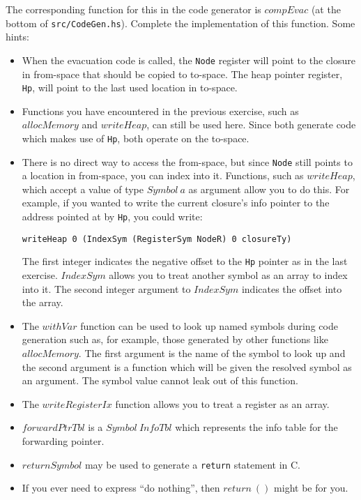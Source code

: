 \documentclass[10pt,a4paper]{exam} %
\begin{document}
\begin{questions}
\begin{parts}
The corresponding function for this in the code generator is $\mathit{compEvac}$ (at the bottom of \texttt{src/CodeGen.hs}). Complete the implementation of this function. Some hints:
\begin{itemize}
\item When the evacuation code is called, the \texttt{Node} register will point to the closure in from-space that should be copied to to-space. The heap pointer register, \texttt{Hp}, will point to the last used location in to-space.
\item Functions you have encountered in the previous exercise, such as $\mathit{allocMemory}$ and $\mathit{writeHeap}$, can still be used here. Since both generate code which makes use of \texttt{Hp}, both operate on the to-space.
\item There is no direct way to access the from-space, but since \texttt{Node} still points to a location in from-space, you can index into it. Functions, such as $\mathit{writeHeap}$, which accept a value of type $\mathit{Symbol}~a$ as argument allow you to do this. For example, if you wanted to write the current closure's info pointer to the address pointed at by \texttt{Hp}, you could write:
\begin{verbatim}
writeHeap 0 (IndexSym (RegisterSym NodeR) 0 closureTy)
\end{verbatim}
The first integer indicates the negative offset to the \texttt{Hp} pointer as in the last exercise. $\mathit{IndexSym}$ allows you to treat another symbol as an array to index into it. The second integer argument to $\mathit{IndexSym}$ indicates the offset into the array.
\item The $\mathit{withVar}$ function can be used to look up named symbols during code generation such as, for example, those generated by other functions like $\mathit{allocMemory}$. The first argument is the name of the symbol to look up and the second argument is a function which will be given the resolved symbol as an argument. The symbol value cannot leak out of this function.
\item The $\mathit{writeRegisterIx}$ function allows you to treat a register as an array.
\item $\mathit{forwardPtrTbl}$ is a $\mathit{Symbol}~\mathit{InfoTbl}$ which represents the info table for the forwarding pointer.
\item $\mathit{returnSymbol}$ may be used to generate a \texttt{return} statement in C.
\item If you ever need to express ``do nothing'', then $\mathit{return}~()$ might be for you.
\end{itemize} 


\end{parts}
\end{questions}
\end{document}
